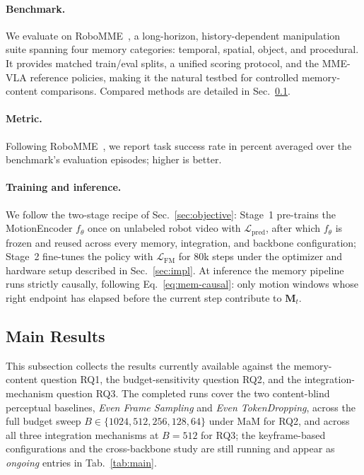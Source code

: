 \documentclass{article}
\begin{document}
\paragraph{Benchmark.}
We evaluate on RoboMME~\citep{dai2026robomme}, a long-horizon,
history-dependent manipulation suite spanning four memory categories:
temporal, spatial, object, and procedural. It provides matched train/eval
splits, a unified scoring protocol, and the MME-VLA reference policies,
making it the natural testbed for controlled memory-content comparisons.
Compared methods are detailed in Sec.~\ref{sec:main-results}.

\paragraph{Metric.}
Following RoboMME~\citep{dai2026robomme}, we report task success rate in percent averaged over the benchmark's evaluation episodes; higher is better.

\paragraph{Training and inference.}
We follow the two-stage recipe of Sec.~\ref{sec:objective}: Stage~1
pre-trains the MotionEncoder $f_\theta$ once on unlabeled robot video with
$\mathcal{L}_{\mathrm{pred}}$, after which $f_\theta$ is frozen and reused
across every memory, integration, and backbone configuration; Stage~2
fine-tunes the policy with $\mathcal{L}_{\mathrm{FM}}$ for $80$k steps
under the optimizer and hardware setup described in Sec.~\ref{sec:impl}.
At inference the memory pipeline runs strictly causally,
following Eq.~\ref{eq:mem-causal}: only motion windows whose right endpoint has
elapsed before the current step contribute to $\mathbf{M}_t$.

\subsection{Main Results}
\label{sec:main-results}

This subsection collects the results currently available against the
memory-content question RQ1, the budget-sensitivity question RQ2,
and the integration-mechanism question RQ3.
The completed runs cover the two content-blind perceptual baselines,
\emph{Even Frame Sampling} and \emph{Even TokenDropping}, across the
full budget sweep $B\!\in\!\{1024,512,256,128,64\}$ under MaM for RQ2,
and across all three integration mechanisms at $B\!=\!512$ for RQ3;
the keyframe-based configurations and the cross-backbone study are still
running and appear as \emph{ongoing} entries in Tab.~\ref{tab:main}.
\end{document}
